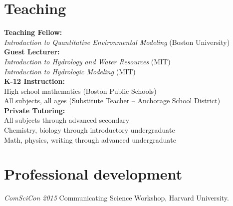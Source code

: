 \documentclass[10pt, a4paper]{article}
\renewcommand{\emph}[1]{\textit{#1}}
\newcommand{\years}[1]{\marginnote{\scriptsize #1}}
\begin{document}
\section*{Teaching}
\textbf{Teaching Fellow:}\\
\hspace*{3em}\emph{Introduction to Quantitative Environmental Modeling} (Boston University)\\
\textbf{Guest Lecturer:}\\
\hspace*{3em}\emph{Introduction to Hydrology and Water Resources} (MIT)\\
\hspace*{3em}\emph{Introduction to Hydrologic Modeling} (MIT)\\
\textbf{K-12 Instruction:}\\
\hspace*{3em}High school mathematics (Boston Public Schools)\\
\hspace*{3em}All subjects, all ages (Substitute Teacher -- Anchorage School District)\\
\textbf{Private Tutoring:}\\
\hspace*{3em}All subjects through advanced secondary\\
\hspace*{3em}Chemistry, biology through introductory undergraduate\\
\hspace*{3em}Math, physics, writing through advanced undergraduate\\

\section*{Professional development}
\years{2015} \emph{ComSciCon 2015} Communicating Science Workshop, Harvard University.
\end{document}
